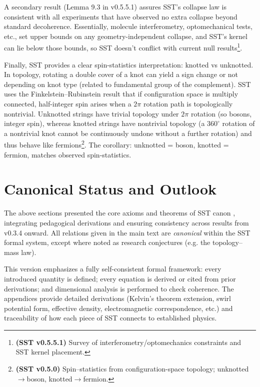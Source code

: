 \documentclass[reprint,aps,onecolumn,nofootinbib]{revtex4-2}
\begin{document}
    A secondary result (Lemma 9.3 in v0.5.5.1) assures SST’s collapse law is consistent with all experiments that have observed no extra collapse beyond standard decoherence. Essentially, molecule interferometry, optomechanical tests, etc., set upper bounds on any geometry-independent collapse, and SST’s kernel can lie below those bounds, so SST doesn’t conflict with current null results\footnote{\textbf{(SST v0.5.5.1)} Survey of interferometry/optomechanics constraints and SST kernel placement.}.

    Finally, SST provides a clear spin-statistics interpretation: knotted vs unknotted. In topology, rotating a double cover of a knot can yield a sign change or not depending on knot type (related to fundamental group of the complement). SST uses the Finkelstein–Rubinstein result that if configuration space is multiply connected, half-integer spin arises when a $2\pi$ rotation path is topologically nontrivial. Unknotted strings have trivial topology under $2\pi$ rotation (so bosons, integer spin), whereas knotted strings have nontrivial topology (a $360^\circ$ rotation of a nontrivial knot cannot be continuously undone without a further rotation) and thus behave like fermions\footnote{\textbf{(SST v0.5.0)} Spin–statistics from configuration-space topology; unknotted$\to$boson, knotted$\to$fermion.}. The corollary: unknotted = boson, knotted = fermion, matches observed spin-statistics.


\section{Canonical Status and Outlook}
    The above sections presented the core axioms and theorems of SST canon \canonversion, integrating pedagogical derivations and ensuring consistency across results from v0.3.4 onward. All relations given in the main text are \emph{canonical} within the SST formal system, except where noted as research conjectures (e.g. the topology–mass law).

    This version emphasizes a fully self-consistent formal framework: every introduced quantity is defined; every equation is derived or cited from prior derivations; and dimensional analysis is performed to check coherence. The appendices provide detailed derivations (Kelvin’s theorem extension, swirl potential form, effective density, electromagnetic correspondence, etc.) and traceability of how each piece of SST connects to established physics.
\end{document}
